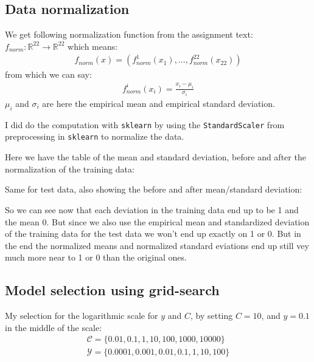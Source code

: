 \subsection{Data normalization}
We get following normalization function from the assignment text: $f_{norm}:\mathbb{R}^{22}\to \mathbb{R}^{22}$ which means:
\begin{align*}
f_{norm}(x) = \left(f^1_{norm}(x_1), ...,f^{22}_{norm}(x_{22})\right) 
\end{align*}
from which we can say:
\begin{align*}
f^i_{norm}(x_i) = \frac{x_i - \mu_i}{\sigma_i}
\end{align*}
$\mu_i$ and $\sigma_i$ are here the empirical mean and empirical standard deviation.

I did do the computation with \texttt{sklearn} by using the \texttt{StandardScaler} from preprocessing in \texttt{sklearn}
to normalize the data.

Here we have the table of the mean and standard deviation, before and after the normalization of the training data:
\begin{center}

\end{center}

Same for test data, also showing the before and after mean/standard deviation:
\begin{center}

\end{center}

So we can see now that each deviation in the training data end up to be 1 and the mean 0.
But since we also use the empirical mean and standardized deviation of the training data for the test data we won't end up exactly on 1 or 0.
But in the end the normalized means and normalized standard eviations end up still vey much more near to 1 or 0 than the original ones.

\subsection{Model selection using grid-search}

My selection for the logarithmic scale for $y$ and $C$, by setting $C=10$, and $y=0.1$ in the middle of the scale:
\begin{align*}
\mathcal{C}=\{0.01,0.1,1,10,100,1000,10000\}\\ 
\mathcal{Y} = \{0.0001,0.001,0.01,0.1,1,10,100 \}
\end{align*}

